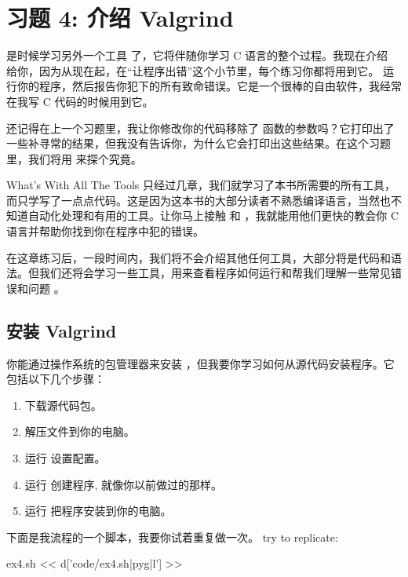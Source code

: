 \chapter{习题 4: 介绍 Valgrind}

是时候学习另外一个工具  了，它将伴随你学习 C 语言的整个过程。我现在介绍  给你，因为从现在起，在“让程序出错”这个小节里，每个练习你都将用到它。 运行你的程序，然后报告你犯下的所有致命错误。它是一个很棒的自由软件，我经常在我写 C 代码的时候用到它。

还记得在上一个习题里，我让你修改你的代码移除了  函数的参数吗？它打印出了一些补寻常的结果，但我没有告诉你，为什么它会打印出这些结果。在这个习题里，我们将用  来探个究竟。

\begin{aside}{What's With All The Tools}
只经过几章，我们就学习了本书所需要的所有工具，而只学写了一点点代码。这是因为这本书的大部分读者不熟悉编译语言，当然也不知道自动化处理和有用的工具。让你马上接触   和  ，我就能用他们更快的教会你 C 语言并帮助你找到你在程序中犯的错误。

在这章练习后，一段时间内，我们将不会介绍其他任何工具，大部分将是代码和语法。但我们还将会学习一些工具，用来查看程序如何运行和帮我们理解一些常见错误和问题 。

\end{aside}

\section{安装 Valgrind}

 你能通过操作系统的包管理器来安装 ，但我要你学习如何从源代码安装程序。它包括以下几个步骤：

\begin{enumerate}
\item 下载源代码包。
\item 解压文件到你的电脑。
\item 运行  设置配置。
\item 运行  创建程序, 就像你以前做过的那样。
\item 运行  把程序安装到你的电脑。
\end{enumerate}

下面是我流程的一个脚本，我要你试着重复做一次。
try to replicate:

\begin{code}{ex4.sh}
<< d['code/ex4.sh|pyg|l'] >>
\end{code}


